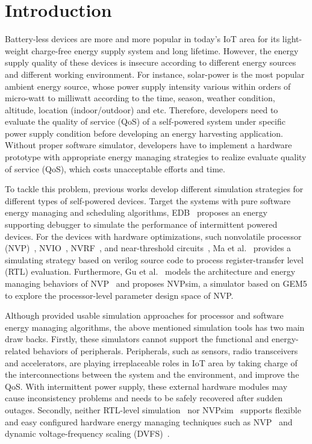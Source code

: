 \section{Introduction}	\label{sec:intro}
%
Battery-less devices are more and more popular in today's IoT area for its light-weight charge-free energy supply system and long lifetime.
However, the energy supply quality of these devices is insecure according to different energy sources and different working environment.
For instance, solar-power is the most popular ambient energy source, whose power supply intensity various within orders of micro-watt to milliwatt according to the time, season, weather condition, altitude, location (indoor/outdoor) and etc. 
Therefore, developers need to evaluate the quality of service (QoS) of a self-powered system under specific power supply condition before developing an energy harvesting application.
Without proper software simulator, developers have to implement a hardware prototype with appropriate energy managing strategies to realize evaluate quality of service (QoS), which costs unacceptable efforts and time.

%
To tackle this problem, previous works develop different simulation strategies for different types of self-powered devices.
Target the systems with pure software energy managing and scheduling algorithms, EDB~\cite{Colin2016An} proposes an energy supporting debugger to simulate the performance of intermittent powered devices.
For the devices with hardware optimizations, such nonvolatile processor (NVP)~\cite{wang20123us,wang2017a,Su2016A,Liu2015Ambient}, NVIO~\cite{li2016hw}, NVRF~\cite{wang2017a130nm}, and near-threshold circuits~\cite{}, Ma et al.~\cite{Ma2015Architecture} provides a simulating strategy based on verilog source code to process register-transfer level (RTL) evaluation.
Furthermore, Gu et al.~\cite{gu2016nvpsim} models the architecture and energy managing behaviors of NVP~\cite{wang20123us} and proposes NVPsim, a simulator based on GEM5 to explore the processor-level parameter design space of NVP.

%
Although provided usable simulation approaches for processor and software energy managing algorithms, the above mentioned simulation tools has two main draw backs. 
Firstly, these simulators cannot support the functional and energy-related behaviors of peripherals.
Peripherals, such as sensors, radio transceivers and accelerators, are playing irreplaceable roles in IoT area by taking charge of the interconnections between the system and the environment, and improve the QoS. 
With intermittent power supply, these external hardware modules may cause inconsistency problems and needs to be safely recovered after sudden outages.
Secondly, neither RTL-level simulation~\cite{Ma2015Architecture} nor NVPsim~\cite{gu2016nvpsim} supports flexible and easy configured hardware energy managing techniques such as NVP~\cite{wang20123us} and dynamic voltage-frequency scaling (DVFS)~\cite{}.

